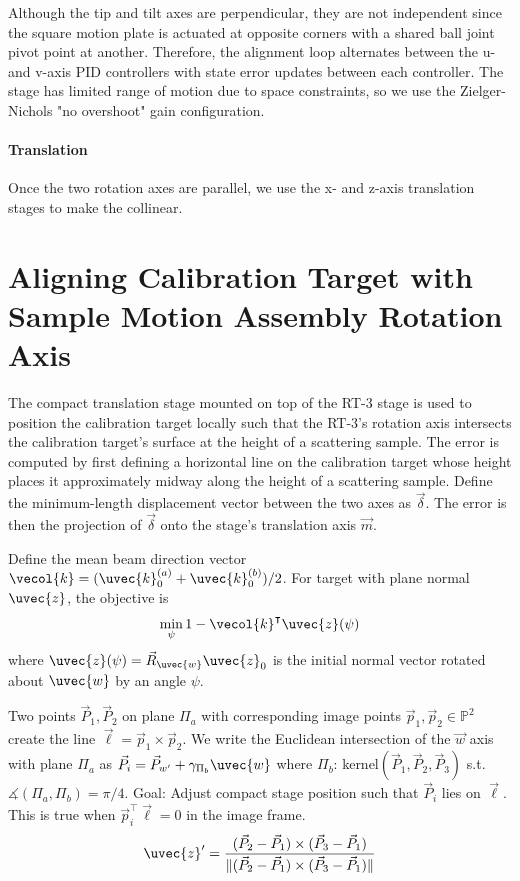 Although the tip and tilt axes are perpendicular, they are not independent since the square motion plate is actuated at opposite corners with a shared ball joint pivot point at another. Therefore, the alignment loop alternates between the u- and v-axis PID controllers with state error updates between each controller. The stage has limited range of motion due to space constraints, so we use the Zielger-Nichols "no overshoot" gain configuration.

\paragraph{Translation} Once the two rotation axes are parallel, we use the x- and z-axis translation stages to make the collinear. 


\section{Aligning Calibration Target with Sample Motion Assembly Rotation Axis}
The compact translation stage mounted on top of the RT-3 stage is used to position the calibration target locally such that the RT-3's rotation axis intersects the calibration target's surface at the height of a scattering sample. The error is computed by first defining a horizontal line on the calibration target whose height places it approximately midway along the height of a scattering sample. Define the minimum-length displacement vector between the two axes as $\vec{\delta}$. The error is then the projection of $\vec{\delta}$ onto the stage's translation axis $\vec{m}$.

Define the mean beam direction vector $\vecol{k} = (\uvec{k}^{(a)}_0 + \uvec{k}^{(b)}_0)/2$. For target with plane normal $\uvec{z}$, the objective is
\begin{equation}
    \min_{\psi} 1 - \vecol{k}^\intercal \uvec{z}(\psi)
\end{equation}
where $\uvec{z}(\psi) = \vec{R}_{\uvec{w}} \uvec{z}_0$ is the initial normal vector rotated about $\uvec{w}$ by an angle $\psi$.

Two points $\vec{P}_1, \vec{P}_2$ on plane $\Pi_a$ with corresponding image points $\vec{p}_1, \vec{p}_2 \in \mathbb{P}^2$ create the line $\vec{\ell} = \vec{p}_1 \times \vec{p}_2$. We write the Euclidean intersection of the $\vec{w}$ axis with plane $\Pi_a$ as $\vec{P}_i = \vec{P}_{w'} + \gamma_{\Pi_b} \uvec{w}$ where $\Pi_b$: kernel$(\vec{P}_1, \vec{P}_2, \vec{P}_3)$ s.t. $\measuredangle (\Pi_a, \Pi_b) = \pi/4$. Goal: Adjust compact stage position such that $\vec{P}_i$ lies on $\vec{\ell}$. This is true when $\vec{p}^\intercal_i \vec{\ell} = 0$ in the image frame.
\begin{equation}
    \uvec{z}' = \frac{(\vec{P}_2 - \vec{P}_1) \times (\vec{P}_3 - \vec{P}_1)}{\|(\vec{P}_2 - \vec{P}_1) \times (\vec{P}_3 - \vec{P}_1)\|}
\end{equation}

